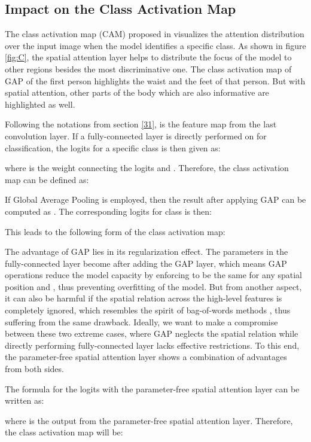 \documentclass[10pt,twocolumn,letterpaper]{article}
\begin{document}
\subsection{Impact on the Class Activation Map} \label{ICAM}
The class activation map (CAM) proposed in \cite{CAM} visualizes the attention distribution over the input image when the model identifies a specific class. As shown in figure \ref{fig:C}, the spatial attention layer helps to distribute the focus of the model to other regions besides the most discriminative one. The class activation map of GAP of the first person highlights the waist and the feet of that person. But with spatial attention, other parts of the body which are also informative are highlighted as well.

Following the notations from section \ref{31},  is the feature map from the last convolution layer. If a fully-connected layer is directly performed on  for classification, the logits  for a specific class  is then given as:

where  is the weight connecting the logits  and . Therefore, the class activation map  can be defined as:

If Global Average Pooling is employed, then the result  after applying GAP can be computed as . The corresponding logits for class  is then:

This leads to the following form of the class activation map:

The advantage of GAP lies in its regularization effect. The parameters  in the fully-connected layer become  after adding the GAP layer, which means GAP operations reduce the model capacity by enforcing  to be the same for any spatial position  and , thus preventing overfitting of the model. But from another aspect, it can also be harmful if  the spatial relation across the high-level features is completely ignored, which resembles the spirit of bag-of-words methods \cite{BOW}, thus suffering from the same drawback. Ideally, we want to make a compromise between these two extreme cases, where GAP neglects the spatial relation while directly performing fully-connected layer lacks effective restrictions. To this end, the parameter-free spatial attention layer shows a combination of advantages from both sides.

The formula for the logits  with the parameter-free spatial attention layer can be written as:

where  is the output from the parameter-free spatial attention layer. Therefore, the class activation map will be:
\end{document}
